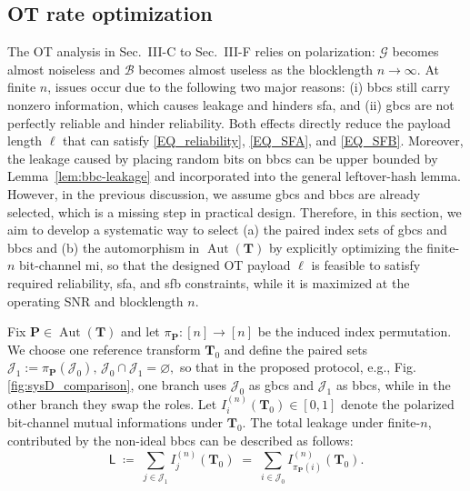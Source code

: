 \documentclass[onecolumn]{IEEEtran} %
\newcommand{\bP}{\mathbf P}
\newcommand{\1}{\mathbbm{1}}
\DeclareMathOperator{\Aut}{Aut}
\theoremstyle{boldremark}
\newcommand{\bT}{\mathbf{T}}
\begin{document}
\subsection{OT rate optimization}\label{subsec_finite_n}
The OT analysis in Sec.~III-C to Sec.~III-F relies on polarization:
$\mathcal{G}$ becomes almost noiseless and $\mathcal{B}$ becomes almost useless as the blocklength $n\to\infty$.
At finite $n$, issues occur due to the following two major reasons: (i) \gls{bbcs} still carry nonzero information, which causes leakage and hinders \gls{sfa}, and (ii) \gls{gbcs} are not perfectly reliable and hinder reliability. Both effects directly reduce the payload length $\ell$ that can satisfy
\eqref{EQ_reliability}, \eqref{EQ_SFA}, and \eqref{EQ_SFB}.
Moreover, the leakage caused by placing random bits on \gls{bbcs} can be upper bounded by Lemma~\ref{lem:bbc-leakage} and incorporated into the general leftover-hash lemma. However, in the previous discussion, we assume \gls{gbcs} and \gls{bbcs} are already selected, which is a missing step in practical design. Therefore, in this section, we aim to develop a systematic way to select (a) the paired index sets of \gls{gbcs} and \gls{bbcs} and (b) the automorphism in $\Aut(\bT)$ by explicitly optimizing the finite-$n$ bit-channel \gls{mi}, so that the designed OT payload $\ell$ is feasible to satisfy required reliability, \gls{sfa}, and \gls{sfb} constraints, while it is maximized at the operating SNR and blocklength $n$.


Fix $\bP\in\Aut(\bT)$ and let $\pi_\bP:[n]\to[n]$ be the induced index permutation.
We choose one reference transform $\bT_0$ and define the paired sets
$\mathcal{J}_1 := \pi_{\bP}(\mathcal{J}_0),\, \mathcal{J}_0\cap\mathcal{J}_1=\varnothing,$
so that in the proposed protocol, e.g., Fig. \ref{fig:sysD_comparison}, one branch uses $\mathcal{J}_0$ as \gls{gbcs} and $\mathcal{J}_1$ as \gls{bbcs},
while in the other branch they swap the roles. Let $I_i^{(n)}(\bT_0)\in[0,1]$ denote the polarized bit-channel mutual informations under $\bT_0$.
The total leakage under finite-$n$, contributed by the non-ideal \gls{bbcs} can be described as follows:
\begin{equation}\label{eq:leakage-def}
\textsf{L}
\;\coloneqq\;
\sum_{j\in\mathcal{J}_1} I_j^{(n)}(\bT_0)
\;=\;
\sum_{i\in\mathcal{J}_0} I_{\pi_{\bP}{(i)}}^{(n)}(\bT_0).
\end{equation}
\end{document}
